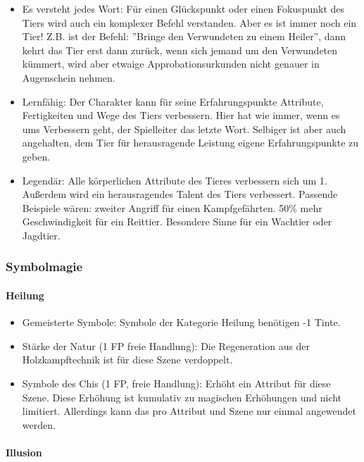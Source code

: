 \documentclass{article}
\begin{document}
\begin{itemize}
\item Es versteht jedes Wort: Für einen Glückspunkt oder einen Fokuspunkt des Tiers wird auch ein komplexer Befehl verstanden. Aber es ist immer noch ein Tier! Z.B. ist der Befehl: ''Bringe den Verwundeten zu einem Heiler'', dann kehrt das Tier erst dann zurück, wenn sich jemand um den Verwundeten kümmert, wird aber etwaige Approbationsurkunden nicht genauer in Augenschein nehmen.
\item Lernfähig: Der Charakter kann für seine Erfahrungspunkte Attribute, Fertigkeiten und Wege des Tiers verbessern. Hier hat wie immer, wenn es ums Verbessern geht, der Spielleiter das letzte Wort. Selbiger ist aber auch angehalten, dem Tier für herausragende Leistung eigene Erfahrungspunkte zu geben.
\item Legendär: Alle körperlichen Attribute des Tieres verbessern sich um 1. Außerdem wird ein herausragendes Talent des Tiers verbessert. Passende Beispiele wären: zweiter Angriff für einen Kampfgefährten. 50\% mehr Geschwindigkeit für ein Reittier. Besondere Sinne für ein Wachtier oder Jagdtier.
\end{itemize}

\subsubsection{Symbolmagie}

\paragraph{Heilung}

\begin{itemize}
\item Gemeisterte Symbole: Symbole der Kategorie Heilung benötigen -1 Tinte.
\item Stärke der Natur (1 FP freie Handlung): Die Regeneration aus der Holzkampftechnik ist für diese Szene verdoppelt.
\item Symbole des Chis (1 FP, freie Handlung): Erhöht ein Attribut für diese Szene. Diese Erhöhung ist kumulativ zu magischen Erhöhungen und nicht limitiert. Allerdings kann das pro Attribut und Szene nur einmal angewendet werden.
\end{itemize}

\paragraph{Illusion}
\end{document}
